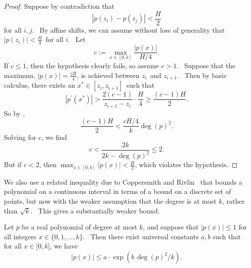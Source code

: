 \begin{proof}
Suppose by contradiction that
\begin{equation}
\left\vert p\left(  z_{i}\right)  -p\left(  z_{j}\right)  \right\vert
<\frac{H}{2}
\end{equation}
for all $i,j$. \ By affine shifts, we can assume without loss of generality
that $\left\vert p\left(  z_{i}\right)  \right\vert <\frac{H}{4}$\ for all
$i$. \ Let
\begin{equation}
c:=\max_{x\in\left[  0,k\right]  }\frac{\left\vert p\left(  x\right)
\right\vert }{H/4}.
\end{equation}
If $c\leq1$, then the hypothesis clearly fails, so assume $c>1$. \ Suppose
that the maximum, $\left\vert p\left(  x\right)  \right\vert =\frac{cH}{4}$,
is achieved between $z_{i}$\ and $z_{i+1}$. \ Then by basic calculus, there
exists an $x^{\ast}\in\left[  z_{i},z_{i+1}\right]  $\ such that
\begin{equation}
\left\vert p^{\prime}\left(  x^{\ast}\right)  \right\vert >\frac{2\left(
c-1\right)  }{z_{i+1}-z_{i}}\cdot\frac{H}{4}\geq\frac{\left(  c-1\right)
H}{2}.
\end{equation}
So by ,
\begin{equation}
\frac{\left(  c-1\right)  H}{2}<\frac{cH/4}{k}\deg\left(  p\right)  ^{2}.
\end{equation}
Solving for $c$, we find
\begin{equation}
c<\frac{2k}{2k-\deg\left(  p\right)  ^{2}}\leq2.
\end{equation}
But if $c<2$, then $\max_{x\in\left[  0,k\right]  }\left\vert p\left(
x\right)  \right\vert <\frac{H}{2}$, which violates the hypothesis.
\end{proof}

We also use a related inequality due to Coppersmith and Rivlin~\cite
{coppersmith-rivlin} that bounds a polynomial on a continuous interval in
terms of a bound on a discrete set of points, but now with the weaker
assumption that the degree is at most $k$, rather than $\sqrt{k}$. \ This
gives a substantially weaker bound.

\begin{lemma}
\label{lem:coppersmith_rivlin} Let $p$ be a real polynomial of degree at
most $k$, and suppose that $\left\vert p(x)\right\vert \leq 1$ for all
integers $x\in \{0,1,\ldots ,k\}$. \ Then there exist universal constants $
a,b$ such that for all $x\in \lbrack 0,k]$, we have
\begin{equation}
\left\vert p(x)\right\vert \leq a\cdot \exp \left( b\,\deg (p)^{2}/k\right) .
\end{equation}
\end{lemma}


